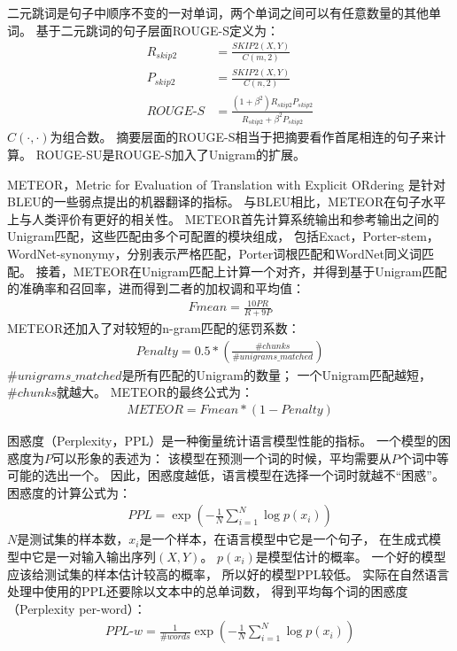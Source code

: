 二元跳词是句子中顺序不变的一对单词，两个单词之间可以有任意数量的其他单词。
基于二元跳词的句子层面ROUGE-S定义为：
\begin{align}
    R_{skip2} &= \frac{\textit{SKIP2}(X, Y)}{C(m, 2)} \\
    P_{skip2} &= \frac{\textit{SKIP2}(X, Y)}{C(n, 2)} \\
    \textit{ROUGE-S} &= \frac{(1 + \beta^2) R_{skip2}P_{skip2}}{R_{skip2} + \beta^2 P_{skip2}}
\end{align}
$C(\cdot, \cdot)$为组合数。
摘要层面的ROUGE-S相当于把摘要看作首尾相连的句子来计算。
ROUGE-SU是ROUGE-S加入了Unigram的扩展。

METEOR，Metric for Evaluation of Translation with Explicit ORdering
是针对BLEU的一些弱点提出的机器翻译的指标。
与BLEU相比，METEOR在句子水平上与人类评价有更好的相关性。
METEOR首先计算系统输出和参考输出之间的Unigram匹配，这些匹配由多个可配置的模块组成，
包括Exact，Porter-stem，WordNet-synonymy，分别表示严格匹配，Porter词根匹配和WordNet同义词匹配。
接着，METEOR在Unigram匹配上计算一个对齐，并得到基于Unigram匹配的准确率和召回率，进而得到二者的加权调和平均值：
\begin{align}
    \textit{Fmean} = \frac{10PR}{R + 9P}
\end{align}
METEOR还加入了对较短的n-gram匹配的惩罚系数：
\begin{align}
    \textit{Penalty} = 0.5 * \left( \frac{\#chunks}{\#unigrams\_matched} \right)
\end{align}
$\#unigrams\_matched$是所有匹配的Unigram的数量；
一个Unigram匹配越短，$\#chunks$就越大。
METEOR的最终公式为：
\begin{align}
    \textit{METEOR} = \textit{Fmean} * (1 - \textit{Penalty})
\end{align}

困惑度（Perplexity，PPL）是一种衡量统计语言模型性能的指标。
一个模型的困惑度为$P$可以形象的表述为：
该模型在预测一个词的时候，平均需要从$P$个词中等可能的选出一个。
因此，困惑度越低，语言模型在选择一个词时就越不“困惑”。
困惑度的计算公式为：
\begin{align}
    \textit{PPL} = \exp(-\frac{1}{N} \sum_{i=1}^N \log p(x_i))
\end{align}
$N$是测试集的样本数，$x_i$是一个样本，在语言模型中它是一个句子，
在生成式模型中它是一对输入输出序列$(X, Y)$。
$p(x_i)$是模型估计的概率。
一个好的模型应该给测试集的样本估计较高的概率， 所以好的模型PPL较低。
实际在自然语言处理中使用的PPL还要除以文本中的总单词数，
得到平均每个词的困惑度（Perplexity per-word）：
\begin{align}
    \textit{PPL-w} = \frac{1}{\#\textit{words}} \exp(-\frac{1}{N} \sum_{i=1}^N \log p(x_i))
\end{align}

